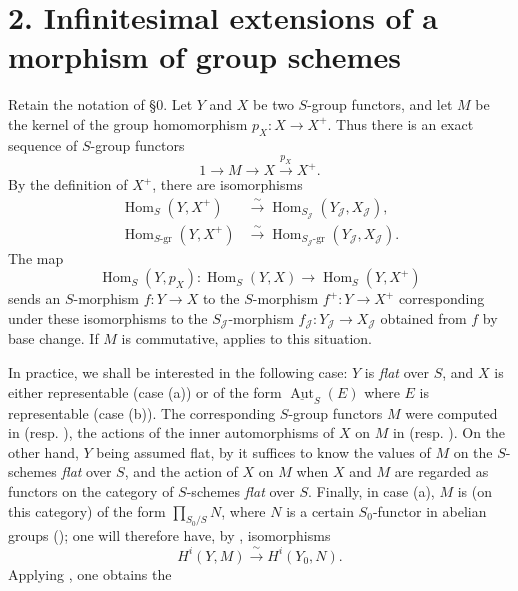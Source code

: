

\section*{2. Infinitesimal extensions of a morphism of group schemes}

Retain the notation of \S0. Let \(Y\) and \(X\) be two \(S\)-group
functors, and let \(M\) be the kernel of the group homomorphism
\(p_X:X\to X^+\). Thus there is an exact sequence of \(S\)-group
functors
\[
 1\longrightarrow M\longrightarrow X\xrightarrow{p_X}X^+.
\]
By the definition of \(X^+\), there are isomorphisms
\begin{align*}
 \operatorname{Hom}_S(Y,X^+)
  &\xrightarrow{\sim}\operatorname{Hom}_{S_{\mathscr J}}(Y_{\mathscr J},X_{\mathscr J}),\\
 \operatorname{Hom}_{S\text{-}\mathrm{gr}}(Y,X^+)
  &\xrightarrow{\sim}
    \operatorname{Hom}_{S_{\mathscr J}\text{-}\mathrm{gr}}
    (Y_{\mathscr J},X_{\mathscr J}).
\end{align*}
The map
\[
 \operatorname{Hom}_S(Y,p_X):
 \operatorname{Hom}_S(Y,X)\longrightarrow\operatorname{Hom}_S(Y,X^+)
\]
sends an \(S\)-morphism \(f:Y\to X\) to the \(S\)-morphism
\(f^+:Y\to X^+\) corresponding under these isomorphisms to the
\(S_{\mathscr J}\)-morphism
\(f_{\mathscr J}:Y_{\mathscr J}\to X_{\mathscr J}\) obtained from \(f\)
by base change. If \(M\) is commutative,  applies to
this situation.

In practice, we shall be interested in the following case: \(Y\) is
\emph{flat} over \(S\), and \(X\) is either representable (case (a)) or of the
form \(\underline{\operatorname{Aut}}_S(E)\) where \(E\) is representable (case
(b)). The corresponding \(S\)-group functors \(M\) were computed in
 (resp. ), the actions of the inner automorphisms of \(X\) on
\(M\) in  (resp. ). On the other hand, \(Y\) being assumed flat,
by  it suffices to know the values of \(M\) on the \(S\)-schemes
\emph{flat} over \(S\), and the action of \(X\) on \(M\) when \(X\) and \(M\)
are regarded as functors on the category of \(S\)-schemes \emph{flat} over
\(S\). Finally, in case (a), \(M\) is (on this category) of the form
\(\prod_{S_0/S}N\), where \(N\) is a certain \(S_0\)-functor in abelian
groups (); one will therefore have, by , isomorphisms
\[
 H^i(Y,M)\xrightarrow{\ \sim\ }H^i(Y_0,N).
\]
Applying , one obtains the

